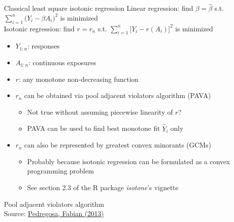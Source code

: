\documentclass{beamer}
\newcommand{\sn}{\sum_{i=1}^n}
\newcommand{\fn}[1]{{\footnotesize #1}}
\begin{document}
\begin{frame}{Classical least square isotonic regression}
  Linear regression: find $\beta=\hat{\beta}$ s.t. $\sn \big( Y_i -\beta A_i \big)^2$ is minimized \\
  Isotonic regression: find $r=r_n$ s.t. $\sn \big[ Y_i -r(A_i) \big]^2$ is minimized
  \begin{itemize}
    \item $Y_{1:n}$: responses
    \item $A_{1:n}$: continuous exposures
    \item $r$: any monotone non-decreasing function
    \item $r_n$ can be obtained via pool adjacent violators algorithm (PAVA)
    \begin{itemize}
      \item Not true without assuming piecewise linearity of $r$?
      \item PAVA can be used to find best monotone fit $\hat{Y}_i$ only
    \end{itemize}
    \item $r_n$ can also be represented by greatest convex minorants (GCMs)
    \begin{itemize}
      \item Probably because isotonic regression can be formulated as a convex programming problem
      \item See section 2.3 of the R package \textit{isotone}'s vignette
    \end{itemize}
  \end{itemize}
\end{frame}

\begin{frame}{Pool adjacent violators algorithm}
   \\
  \fn{Source: \href{http://fa.bianp.net/blog/2013/isotonic-regression/}{Pedregosa, Fabian (2013)}}
\end{frame}
\end{document}
